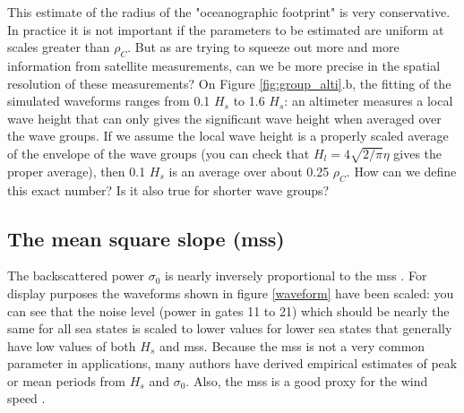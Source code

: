 This estimate of the radius of the "oceanographic footprint" is very conservative. In practice it is not important if the parameters to be estimated are uniform at scales greater than $\rho_C$. But as are trying to squeeze out more and more information from satellite measurements, can we be more precise in the spatial resolution of these measurements?  On Figure \ref{fig:group_alti}.b, the fitting of the simulated waveforms ranges from 0.1 $H_s$ to 1.6 $H_s$: an altimeter measures a local wave height that can only gives the significant wave height when averaged over the wave groups. If we assume the local wave height is a properly scaled average of the envelope of the wave groups (you can check that $H_l=4\sqrt{2/\pi} \eta$ gives the proper average), then 0.1  $H_s$  is an average over about 0.25 $\rho_C$. How can we define this exact number? Is it also true for shorter wave groups? 





\subsection{The mean square slope (mss)}
The backscattered power $\sigma_0$ is nearly inversely proportional to the mss \citep{Vandemark&al.2002}. 
For display purposes the waveforms shown in figure \ref{waveform} have been scaled: you can see that the noise level (power in gates 11 to 21) which should be nearly the same for 
all sea states is scaled to lower values for lower sea states that generally have low values of both $H_s$ and mss.  
Because the mss is not a very common parameter in applications, many authors have derived empirical estimates of peak or mean  periods from $H_s$ and $\sigma_0$. Also, the mss is a good proxy for the wind speed \citep{Cox&Munk1954}.





